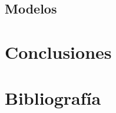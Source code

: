 \documentclass[12pt,twoside]{templates/facsothesis}
\begin{document}
\hypertarget{modelos}{%
\section{Modelos}\label{modelos}}

\hypertarget{conclusiones}{%
\chapter{Conclusiones}\label{conclusiones}}

\hypertarget{bibliografuxeda}{%
\chapter*{Bibliografía}\label{bibliografuxeda}}

\end{document}
